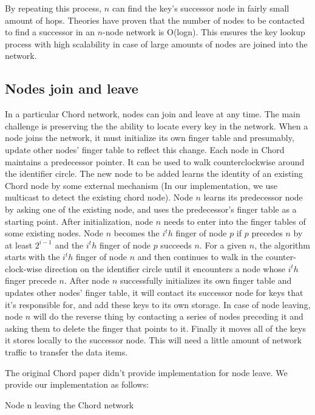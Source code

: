 \documentclass[letterpaper,twocolumn,10pt]{article}
\begin{document}
By repeating this process, $n$ can find the key's successor node in fairly small amount of hops. Theories have proven that the number of nodes to be contacted to find a successor in an $n$-node network is O(logn). This ensures the key lookup process with high scalability in case of large amounts of nodes are joined into the network.

\subsection{Nodes join and leave}

In a particular Chord network, nodes can join and leave at any time. The main challenge is preserving the the ability to locate every key in the network. When a node joins the network, it must initialize its own finger table and presumably, update other nodes' finger table to reflect this change. Each node in Chord maintains a predecessor pointer. It can be used to walk counterclockwise around the identifier circle.  The new node to be added learns the identity of an existing Chord node by some external mechanism (In our implementation, we use multicast to detect the existing chord node). Node $n$ learns its predecessor node by asking one of the existing node, and uses the predecessor's finger table as a starting point. After initialization, node $n$ needs to enter into the finger tables of some existing nodes. Node $n$ becomes the $i^th$ finger of node $p$ if $p$ precedes $n$ by at least $2^{i-1}$ and the $i^th$ finger of node $p$ succeeds $n$. For a given $n$, the algorithm starts with the $i^th$ finger of node $n$ and then continues to walk in the counter-clock-wise direction on the identifier circle until it encounters a node whose $i^th$ finger precede $n$. After node $n$ successfully initializes its own finger table and updates other nodes' finger table, it will contact its successor node for keys that it's responsible for, and add these keys to its own storage. In case of node leaving, node $n$ will do the reverse thing by contacting a series of nodes preceding it and asking them to delete the finger that points to it. Finally it moves all of the keys it stores locally to the successor node. This will need a little amount of network traffic to transfer the data items.

The original Chord paper didn't provide implementation for node leave. We provide our implementation as follows:

\begin{algorithm}
\caption{Node n leaving the Chord network}
\end{algorithm}
\end{document}
